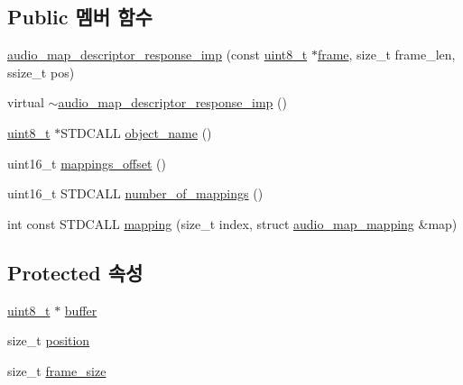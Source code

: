 \subsection*{Public 멤버 함수}
\begin{DoxyCompactItemize}
\item 
\hyperlink{classavdecc__lib_1_1audio__map__descriptor__response__imp_a5dd7433c8db5b0be9f62bc1c58ff3279}{audio\+\_\+map\+\_\+descriptor\+\_\+response\+\_\+imp} (const \hyperlink{stdint_8h_aba7bc1797add20fe3efdf37ced1182c5}{uint8\+\_\+t} $\ast$\hyperlink{gst__avb__playbin_8c_ac8e710e0b5e994c0545d75d69868c6f0}{frame}, size\+\_\+t frame\+\_\+len, ssize\+\_\+t pos)
\item 
virtual \hyperlink{classavdecc__lib_1_1audio__map__descriptor__response__imp_a48bbbadcecb32659d08359b01c2fab7f}{$\sim$audio\+\_\+map\+\_\+descriptor\+\_\+response\+\_\+imp} ()
\item 
\hyperlink{stdint_8h_aba7bc1797add20fe3efdf37ced1182c5}{uint8\+\_\+t} $\ast$S\+T\+D\+C\+A\+LL \hyperlink{classavdecc__lib_1_1audio__map__descriptor__response__imp_a15837e3eb254ad44812cb766ae8cd53c}{object\+\_\+name} ()
\item 
uint16\+\_\+t \hyperlink{classavdecc__lib_1_1audio__map__descriptor__response__imp_ae7b742f5e68310753dac37037e25746f}{mappings\+\_\+offset} ()
\item 
uint16\+\_\+t S\+T\+D\+C\+A\+LL \hyperlink{classavdecc__lib_1_1audio__map__descriptor__response__imp_ae2bf500862519a98450af5a447a1529d}{number\+\_\+of\+\_\+mappings} ()
\item 
int const S\+T\+D\+C\+A\+LL \hyperlink{classavdecc__lib_1_1audio__map__descriptor__response__imp_a6a825a7fda7f566a7914ed0eb495b82c}{mapping} (size\+\_\+t index, struct \hyperlink{structavdecc__lib_1_1audio__map__mapping}{audio\+\_\+map\+\_\+mapping} \&map)
\end{DoxyCompactItemize}
\subsection*{Protected 속성}
\begin{DoxyCompactItemize}
\item 
\hyperlink{stdint_8h_aba7bc1797add20fe3efdf37ced1182c5}{uint8\+\_\+t} $\ast$ \hyperlink{classavdecc__lib_1_1descriptor__response__base__imp_a56ed84df35de10bdb65e72b184309497}{buffer}
\item 
size\+\_\+t \hyperlink{classavdecc__lib_1_1descriptor__response__base__imp_a7a04afe5347934be732ec70a70bd0a28}{position}
\item 
size\+\_\+t \hyperlink{classavdecc__lib_1_1descriptor__response__base__imp_affd041a595cabab98275245b9cb2824d}{frame\+\_\+size}
\end{DoxyCompactItemize}
